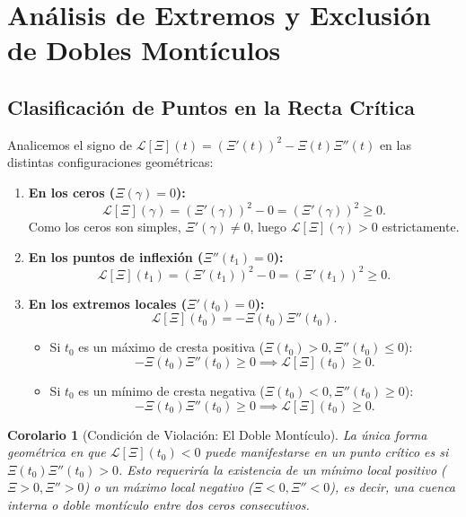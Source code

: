 \documentclass[11pt,a4paper]{article}
\newtheorem{corollary}[theorem]{Corolario}
\theoremstyle{definition}
\theoremstyle{remark}
\begin{document}
\section{Análisis de Extremos y Exclusión de Dobles Montículos}

\subsection{Clasificación de Puntos en la Recta Crítica}

Analicemos el signo de $\mathcal{L}[\Xi](t) = (\Xi'(t))^2 - \Xi(t)\Xi''(t)$ en las distintas configuraciones geométricas:
\begin{enumerate}
    \item \textbf{En los ceros ($\Xi(\gamma) = 0$):}
    \begin{equation}
    \mathcal{L}[\Xi](\gamma) = (\Xi'(\gamma))^2 - 0 = (\Xi'(\gamma))^2 \ge 0.
    \end{equation}
    Como los ceros son simples, $\Xi'(\gamma) \neq 0$, luego $\mathcal{L}[\Xi](\gamma) > 0$ estrictamente.
    \item \textbf{En los puntos de inflexión ($\Xi''(t_1) = 0$):}
    \begin{equation}
    \mathcal{L}[\Xi](t_1) = (\Xi'(t_1))^2 - 0 = (\Xi'(t_1))^2 \ge 0.
    \end{equation}
    \item \textbf{En los extremos locales ($\Xi'(t_0) = 0$):}
    \begin{equation}
    \mathcal{L}[\Xi](t_0) = - \Xi(t_0)\Xi''(t_0).
    \end{equation}
    \begin{itemize}
        \item Si $t_0$ es un máximo de cresta positiva ($\Xi(t_0) > 0, \Xi''(t_0) \le 0$):
        \begin{equation}
        -\Xi(t_0)\Xi''(t_0) \ge 0 \implies \mathcal{L}[\Xi](t_0) \ge 0.
        \end{equation}
        \item Si $t_0$ es un mínimo de cresta negativa ($\Xi(t_0) < 0, \Xi''(t_0) \ge 0$):
        \begin{equation}
        -\Xi(t_0)\Xi''(t_0) \ge 0 \implies \mathcal{L}[\Xi](t_0) \ge 0.
        \end{equation}
    \end{itemize}
\end{enumerate}

\begin{corollary}[Condición de Violación: El Doble Montículo]
La única forma geométrica en que $\mathcal{L}[\Xi](t_0) < 0$ puede manifestarse en un punto crítico es si $\Xi(t_0)\Xi''(t_0) > 0$. Esto requeriría la existencia de un mínimo local positivo ($\Xi > 0, \Xi'' > 0$) o un máximo local negativo ($\Xi < 0, \Xi'' < 0$), es decir, una cuenca interna o doble montículo entre dos ceros consecutivos.
\end{corollary}
\end{document}
